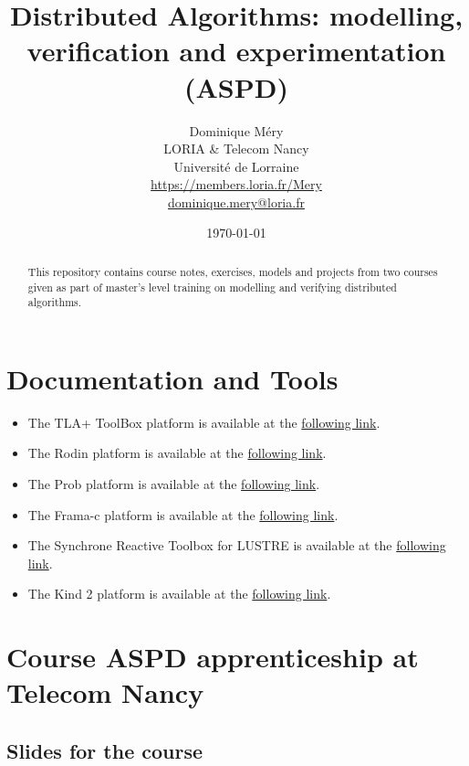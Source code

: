 \documentclass[ 12pt]{article}
\title{Distributed Algorithms:  modelling,  verification   and experimentation  (ASPD)}
\author{Dominique M\'ery\\
LORIA \& Telecom Nancy\\ Universit\'e de Lorraine\\
\url{https://members.loria.fr/Mery}\\ \url{dominique.mery@loria.fr}}
\date{\today}
\begin{document}
  \setcounter{ex}{1}
\maketitle
\begin{abstract}
This repository contains course notes, exercises, models and projects
from two  courses given as part of master's level training on
modelling and verifying  distributed algorithms.
\end{abstract}

\tableofcontents


\section{Documentation and Tools}

\begin{itemize}

    
\item[]  The  TLA+ ToolBox  platform is available at the 
  \href{https://lamport.azurewebsites.net/tla/toolbox.html}{following 
    link}. 
\item[]  The Rodin platform is available at the 
  \href{https://www.event-b.org/install.html}{following 
    link}.

  
  \item[]  The Prob   platform is available at the 
  \href{https://prob.hhu.de}{following 
    link}. 

  
  \item[]  The Frama-c platform is available at the 
  \href{https://www.frama-c.com}{following 
    link}.

  \item[]  The Synchrone Reactive Toolbox for LUSTRE is   available at the 
  \href{https://www-verimag.imag.fr/Outils-SynchronesNEW.html?lang=en}{following 
    link}.

  \item[]  The Kind 2  platform is available at the 
  \href{ https://kind2-mc.github.io/kind2/}{following 
    link}.

  
\end{itemize}




\section{Course  ASPD apprenticeship at Telecom Nancy}
\label{sec:course-mcfsi-at}


\subsection{Slides for the course}
\label{sec:slides}
\end{document}
